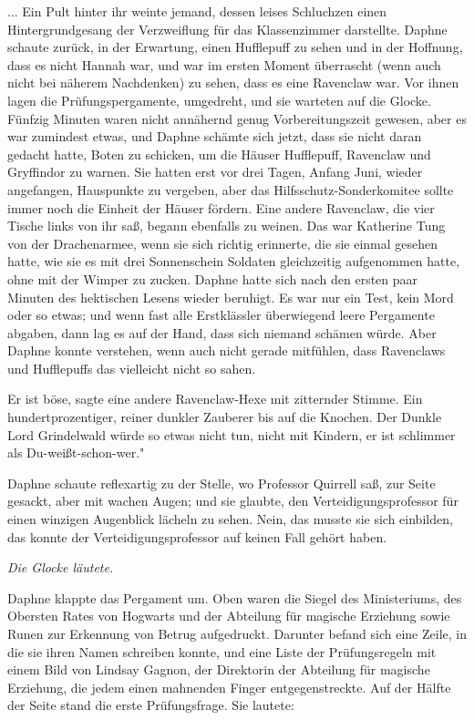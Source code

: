 ... Ein Pult hinter ihr weinte jemand, dessen leises Schluchzen einen
Hintergrundgesang der Verzweiflung für das Klassenzimmer darstellte. Daphne
schaute zurück, in der Erwartung, einen Hufflepuff zu sehen und in der Hoffnung,
dass es nicht Hannah war, und war im ersten Moment überrascht (wenn auch nicht
bei näherem Nachdenken) zu sehen, dass es eine Ravenclaw war. Vor ihnen lagen
die Prüfungspergamente, umgedreht, und sie warteten auf die Glocke. Fünfzig
Minuten waren nicht annähernd genug Vorbereitungszeit gewesen, aber es war
zumindest etwas, und Daphne schämte sich jetzt, dass sie nicht daran gedacht
hatte, Boten zu schicken, um die Häuser Hufflepuff, Ravenclaw und Gryffindor zu
warnen. Sie hatten erst vor drei Tagen, Anfang Juni, wieder angefangen,
Hauspunkte zu vergeben, aber das Hilfsschutz-Sonderkomitee sollte immer noch die
Einheit der Häuser fördern. Eine andere Ravenclaw, die vier Tische links von ihr
saß, begann ebenfalls zu weinen. Das war Katherine Tung von der Drachenarmee,
wenn sie sich richtig erinnerte, die sie einmal gesehen hatte, wie sie es mit
drei Sonnenschein Soldaten gleichzeitig aufgenommen hatte, ohne mit der Wimper
zu zucken. Daphne hatte sich nach den ersten paar Minuten des hektischen Lesens
wieder beruhigt. Es war nur ein Test, kein Mord oder so etwas; und wenn fast
alle Erstklässler überwiegend leere Pergamente abgaben, dann lag es auf der
Hand, dass sich niemand schämen würde. Aber Daphne konnte verstehen, wenn auch
nicht gerade mitfühlen, dass Ravenclaws und Hufflepuffs das vielleicht nicht so
sahen.

\glqq{}Er ist böse\grqq{}, sagte eine andere Ravenclaw-Hexe mit zitternder
Stimme. \glqq{}Ein hundertprozentiger, reiner dunkler Zauberer bis auf die
Knochen. Der Dunkle Lord Grindelwald würde so etwas nicht tun, nicht mit
Kindern, er ist schlimmer als Du-weißt-schon-wer."

Daphne schaute reflexartig zu der Stelle, wo Professor Quirrell saß, zur Seite
gesackt, aber mit wachen Augen; und sie glaubte, den Verteidigungsprofessor für
einen winzigen Augenblick lächeln zu sehen. Nein, das musste sie sich einbilden,
das konnte der Verteidigungsprofessor auf keinen Fall gehört haben.

\emph{Die Glocke läutete.}

Daphne klappte das Pergament um. Oben waren die Siegel des Ministeriums, des
Obersten Rates von Hogwarts und der Abteilung für magische Erziehung sowie Runen
zur Erkennung von Betrug aufgedruckt. Darunter befand sich eine Zeile, in die
sie ihren Namen schreiben konnte, und eine Liste der Prüfungsregeln mit einem
Bild von Lindsay Gagnon, der Direktorin der Abteilung für magische Erziehung,
die jedem einen mahnenden Finger entgegenstreckte. Auf der Hälfte der Seite
stand die erste Prüfungsfrage. Sie lautete:

